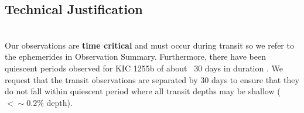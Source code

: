 \documentclass[letterpaper,12pt]{article}
\begin{document}
%
%
%
%
%

\clearpage

\subsection{Technical Justification}

\\
Our observations are \textbf{time critical} and must occur during transit so we refer to the ephemerides in Observation Summary.
Furthermore, there have been quiescent periods observed for KIC 1255b of about ~30 days in duration \citep{vanWerkhoven2014}.
We request that the transit observations are separated by 30 days to ensure that they do not fall within quiescent period where all transit depths may be shallow ($< \sim 0.2\%$ depth).
\newline
\end{document}

